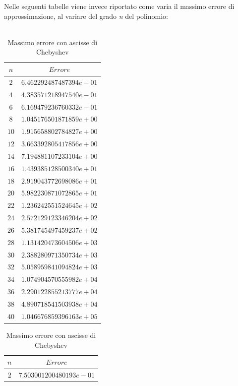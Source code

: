Nelle seguenti tabelle viene invece riportato come varia il massimo errore di approssimazione, al variare del grado \textit{n} del polinomio:\\\
\begin{table}[H]
	\begin{minipage}{0.5\textwidth}
		\centering
		\caption{Massimo errore con ascisse equispaziate}
		\begin{tabular}{|c|c|}
			\hline
			$n$ & $Errore$ \\
			\hline
			$2$  & $6.462292487487394e-01$ \\ 
			$4$  & $4.383571218947540e-01$ \\ 
			$6$  & $6.169479236760332e-01$ \\ 
			$8$  & $1.045176501871859e+00$ \\ 
			$10$ & $1.915658802784827e+00$ \\ 
			$12$ & $3.663392805417856e+00$ \\ 
			$14$ & $7.194881107233104e+00$ \\ 
			$16$ & $1.439385128500340e+01$ \\ 
			$18$ & $2.919043772698086e+01$ \\ 
			$20$ & $5.982230871072865e+01$ \\ 
			$22$ & $1.236242551524645e+02$ \\ 
			$24$ & $2.572129123346204e+02$ \\ 
			$26$ & $5.381745497459237e+02$ \\ 
			$28$ & $1.131420473604506e+03$ \\ 
			$30$ & $2.388280971350734e+03$ \\ 
			$32$ & $5.058959841094824e+03$ \\ 
			$34$ & $1.074904570555982e+04$ \\ 
			$36$ & $2.290122855213777e+04$ \\ 
			$38$ & $4.890718541503938e+04$ \\ 
			$40$ & $1.046676859396163e+05$ \\ 
			\hline
		\end{tabular}
	\end{minipage}
	\hspace*{\fill}
	\begin{minipage}{0.5\textwidth}
		\centering
		\caption{Massimo errore con ascisse di Chebyshev}
		\begin{tabular}{|c|c|}
			\hline
			$n$ & $Errore$ \\
			\hline
			$2$  & $7.503001200480193e-01$ \\ 

\end{tabular}
\end{minipage}
\end{table}
